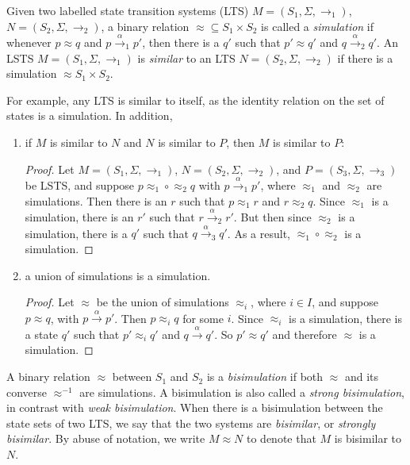 \documentclass[12pt]{article}
\begin{document}
Given two labelled state transition systems (LTS) $M=(S_1,\Sigma, \rightarrow_1)$, $N=(S_2,\Sigma, \rightarrow_2)$, a binary relation $\approx \subseteq S_1\times S_2$ is called a \emph{simulation} if whenever $p \approx q$ and $p \stackrel{\alpha}{\rightarrow}_1 p'$, then there is a $q'$ such that $p'\approx q'$ and $q\stackrel{\alpha}{\rightarrow}_2 q'$.  An LSTS $M=(S_1,\Sigma,\rightarrow_1)$ is \emph{similar} to an LTS $N=(S_2,\Sigma,\rightarrow_2)$ if there is a simulation $\approx S_1\times S_2$.

For example, any LTS is similar to itself, as the identity relation on the set of states is a simulation.  In addition,
\begin{enumerate}
\item if $M$ is similar to $N$ and $N$ is similar to $P$, then $M$ is similar to $P$:
\begin{proof}
Let $M=(S_1,\Sigma,\rightarrow_1)$, $N=(S_2,\Sigma,\rightarrow_2)$, and $P=(S_3,\Sigma,\rightarrow_3)$ be LSTS, and suppose $p \approx_1 \circ \approx_2 q$ with $p \stackrel{\alpha}{\rightarrow}_1 p'$, where $\approx_1$ and $\approx_2$ are simulations.  Then there is an $r $ such that $p \approx_1 r$ and $r\approx_2 q$.  Since $\approx_1$ is a simulation, there is an $r'$ such that $r \stackrel{\alpha}{\rightarrow}_2 r'$.  But then since $\approx_2$ is a simulation, there is a $q'$ such that $q \stackrel{\alpha}{\rightarrow}_3 q'$.  As a result, $\approx_1\circ \approx_2$ is a simulation.
\end{proof}
\item a union of simulations is a simulation.
\begin{proof}
Let $\approx$ be the union of simulations $\approx_i$, where $i\in I$, and suppose $p\approx q$, with $p \stackrel{\alpha}{\rightarrow} p'$.  Then $p\approx_i q$ for some $i$.  Since $\approx_i$ is a simulation, there is a state $q'$ such that $p' \approx_i q'$ and $q\stackrel{\alpha}{\rightarrow} q'$.  So $p' \approx q'$ and therefore $\approx$ is a simulation.
\end{proof}
\end{enumerate}

A binary relation $\approx$ between $S_1$ and $S_2$ is a \emph{bisimulation} if both $\approx$ and its converse $\approx^{-1}$ are simulations.  A bisimulation is also called a \emph{strong bisimulation}, in contrast with \emph{weak bisimulation}.  When there is a bisimulation between the state sets of two LTS, we say that the two systems are \emph{bisimilar}, or \emph{strongly bisimilar}.  By abuse of notation, we write $M\approx N$ to denote that $M$ is bisimilar to $N$.
\end{document}

